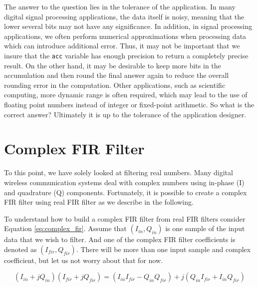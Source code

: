 The answer to the question lies in the tolerance of the application. In many digital signal processing applications, the data itself is noisy, meaning that the lower several bits may not have any significance. In addition, in signal processing applications, we often perform numerical approximations when processing data which can introduce additional error. Thus, it may not be important that we insure that the \lstinline{acc} variable has enough precision to return a completely precise result.  On the other hand, it may be desirable to keep more bits in the accumulation and then round the final answer again to reduce the overall rounding error in the computation. Other applications, such as scientific computing, more dynamic range is often required, which may lead to the use of floating point numbers instead of integer or fixed-point arithmetic. So what is the correct answer? Ultimately it is up to the tolerance of the application designer.



\section{Complex FIR Filter}


To this point, we have solely looked at filtering real numbers. Many digital wireless communication systems deal with complex numbers using in-phase (I) and quadrature (Q) components. Fortunately, it is possible to create a complex FIR filter using real FIR filter as we describe in the following.

To understand how to build a complex FIR filter from real FIR filters consider Equation \ref{eq:complex_fir}. Assume that $(I_{in}, Q_{in})$ is one sample of the input data that we wish to filter.  And one of the complex FIR filter coefficients is denoted as $(I_{fir}, Q_{fir})$. There will be more than one input sample and complex coefficient, but let us not worry about that for now.

\begin{equation}
(I_{in} + j  Q_{in})(I_{fir} + j  Q_{fir}) = (I_{in} I_{fir} - Q_{in}  Q_{fir}) + j  (Q_{in}  I_{fir} + I_{in} Q_{fir})
\label{eq:complex_fir}
\end{equation}


